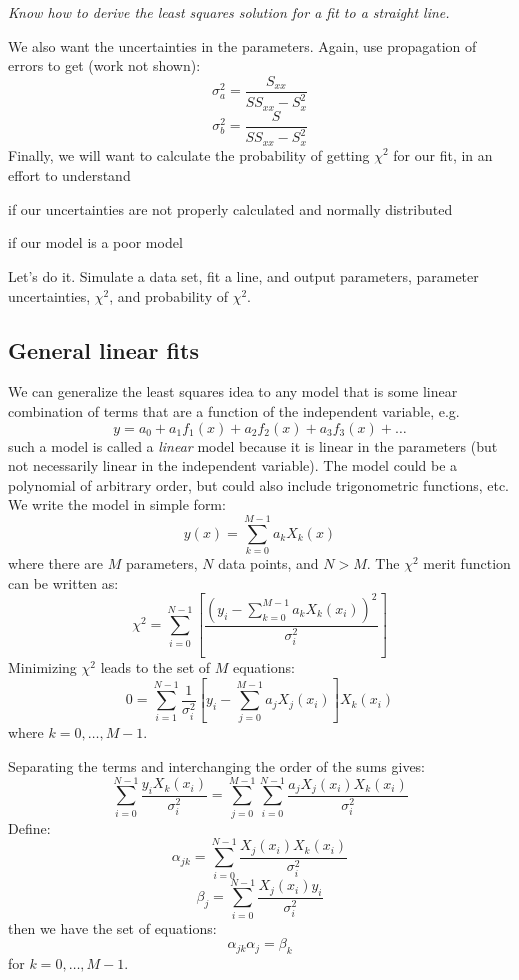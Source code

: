 \documentclass[12pt]{article}
\begin{document}
\colorbox{hl}{\parbox{0.9\textwidth}
{\emph{Know how to derive the least squares solution for a fit to a straight line.}}}

We also want the uncertainties in the parameters.
Again, use propagation of errors to get (work not shown):
$$ \sigma_a^2 = \frac{S_{xx}}{SS_{xx}-S_x^2}   $$
$$ \sigma_b^2 = \frac{S}{SS_{xx}-S_x^2}   $$
Finally, we will want to calculate the probability of getting
$ \chi^{2}_{}$ for our fit,
in an effort to understand
\begin{enumerate*}
    \item if our uncertainties are not properly calculated and normally distributed
    \item if our model is a poor model
\end{enumerate*}

Let's do it. Simulate a data set, fit a line, and output parameters, parameter
uncertainties, $\chi^2$, and probability of $\chi^2$.


\subsection{General linear fits}
We can generalize the least squares idea to any model that is some linear
combination of terms that are a function of the independent variable,
e.g.
$$ y = a_0 + a_1f_1(x) + a_2f_2(x) + a_3f_3(x) + \ldots $$
such a model is called a \emph{linear} model because it is linear
in the parameters (but not necessarily linear in the independent
variable). The model could be a polynomial of arbitrary order, but
could also include trigonometric functions, etc. We write the model
in simple form:
$$ y(x) = \sum_{k=0}^{M-1}a_kX_k(x) $$
where there are $M$ parameters, $N$ data points, and $N>M$.
The $\chi^2$ merit function can be written as:
$$ \chi^2 = \sum_{i=0}^{N-1} \left[
    \frac{(y_i - \sum_{k=0}^{M-1} a_{k}X_{k}(x_{i}))^{2}}
    {\sigma_{i}^{2}} \right] $$
Minimizing $\chi^2$ leads to the set of $M$ equations:
$$ 0 = \sum_{i=1}^{N-1}\frac{1}{\sigma_i^2}
\left[y_{i} - \sum_{j=0}^{M-1}a_{j}X_{j}(x_{i})\right]X_{k}(x_{i}) $$
where $k=0,\ldots,M-1$.

Separating the terms and interchanging the order of the sums gives:
$$\sum_{i=0}^{N-1}\frac{y_{i}X_{k}(x_{i})}{\sigma_{i}^{2}} =
\sum_{j=0}^{M-1}\sum_{i=0}^{N-1}\frac{a_{j}X_{j}(x_{i})X_{k}(x_{i})}{\sigma_{i}^{2}}  $$
Define:
$$ \alpha_{jk} = \sum_{i=0}^{N-1}\frac{X_{j}(x_{i})X_{k}(x_{i})}{\sigma_{i}^{2}}$$
$$ \beta_{j} = \sum_{i=0}^{N-1}\frac{X_{j}(x_{i})y_{i}}{\sigma_{i}^{2}}$$
then we have the set of equations:
$$ \alpha_{jk}\alpha_{j} = \beta_{k} $$
for $k=0,\ldots,M-1$.
\end{document}
